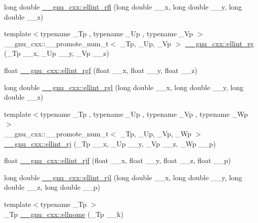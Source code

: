 \begin{DoxyCompactItemize}
long double \hyperlink{group__gnu__math__spec__func_ga38dd36b3db5bbe5da516d0cbe3ff1f21}{\+\_\+\+\_\+gnu\+\_\+cxx\+::ellint\+\_\+rfl} (long double \+\_\+\+\_\+x, long double \+\_\+\+\_\+y, long double \+\_\+\+\_\+z)
\item 
{\footnotesize template$<$typename \+\_\+\+Tp , typename \+\_\+\+Up , typename \+\_\+\+Vp $>$ }\\\+\_\+\+\_\+gnu\+\_\+cxx\+::\+\_\+\+\_\+promote\+\_\+num\+\_\+t$<$ \+\_\+\+Tp, \+\_\+\+Up, \+\_\+\+Vp $>$ \hyperlink{group__gnu__math__spec__func_ga9d3d53ace67dfa6126118fb780095a1f}{\+\_\+\+\_\+gnu\+\_\+cxx\+::ellint\+\_\+rg} (\+\_\+\+Tp \+\_\+\+\_\+x, \+\_\+\+Up \+\_\+\+\_\+y, \+\_\+\+Vp \+\_\+\+\_\+z)
\item 
float \hyperlink{group__gnu__math__spec__func_ga7a4ab348bf312a3425501ac8a3d16494}{\+\_\+\+\_\+gnu\+\_\+cxx\+::ellint\+\_\+rgf} (float \+\_\+\+\_\+x, float \+\_\+\+\_\+y, float \+\_\+\+\_\+z)
\item 
long double \hyperlink{group__gnu__math__spec__func_ga563455d515ed845988552432108a21be}{\+\_\+\+\_\+gnu\+\_\+cxx\+::ellint\+\_\+rgl} (long double \+\_\+\+\_\+x, long double \+\_\+\+\_\+y, long double \+\_\+\+\_\+z)
\item 
{\footnotesize template$<$typename \+\_\+\+Tp , typename \+\_\+\+Up , typename \+\_\+\+Vp , typename \+\_\+\+Wp $>$ }\\\+\_\+\+\_\+gnu\+\_\+cxx\+::\+\_\+\+\_\+promote\+\_\+num\+\_\+t$<$ \+\_\+\+Tp, \+\_\+\+Up, \+\_\+\+Vp, \+\_\+\+Wp $>$ \hyperlink{group__gnu__math__spec__func_ga61c6d7f5b930400eeb8de455667d4292}{\+\_\+\+\_\+gnu\+\_\+cxx\+::ellint\+\_\+rj} (\+\_\+\+Tp \+\_\+\+\_\+x, \+\_\+\+Up \+\_\+\+\_\+y, \+\_\+\+Vp \+\_\+\+\_\+z, \+\_\+\+Wp \+\_\+\+\_\+p)
\item 
float \hyperlink{group__gnu__math__spec__func_gace85b5190b04f57493878c5d672cfabd}{\+\_\+\+\_\+gnu\+\_\+cxx\+::ellint\+\_\+rjf} (float \+\_\+\+\_\+x, float \+\_\+\+\_\+y, float \+\_\+\+\_\+z, float \+\_\+\+\_\+p)
\item 
long double \hyperlink{group__gnu__math__spec__func_gab5405f1669b3ce8b560dc33aa5b97287}{\+\_\+\+\_\+gnu\+\_\+cxx\+::ellint\+\_\+rjl} (long double \+\_\+\+\_\+x, long double \+\_\+\+\_\+y, long double \+\_\+\+\_\+z, long double \+\_\+\+\_\+p)
\item 
{\footnotesize template$<$typename \+\_\+\+Tp $>$ }\\\+\_\+\+Tp \hyperlink{group__gnu__math__spec__func_ga7bfb34f8b5c0ed7c72040f9cb7034bba}{\+\_\+\+\_\+gnu\+\_\+cxx\+::ellnome} (\+\_\+\+Tp \+\_\+\+\_\+k)
\item 

\end{DoxyCompactItemize}
